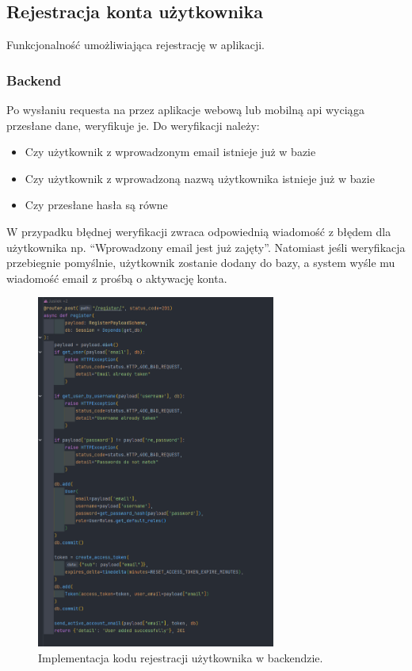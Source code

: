 
\subsection{Rejestracja konta użytkownika}
Funkcjonalność umożliwiająca rejestrację w aplikacji.

\subsubsection{Backend}
Po wysłaniu requesta na przez aplikacje webową lub mobilną api wyciąga przesłane dane, weryfikuje je. Do weryfikacji należy:

\begin{itemize}
    \item Czy użytkownik z wprowadzonym email istnieje już w bazie
    \item Czy użytkownik z wprowadzoną nazwą użytkownika istnieje już w bazie
    \item Czy przesłane hasła są równe
\end{itemize}

W przypadku błędnej weryfikacji zwraca odpowiednią wiadomość z błędem dla użytkownika np. “Wprowadzony email jest już zajęty”. Natomiast jeśli weryfikacja przebiegnie pomyślnie, użytkownik zostanie dodany do bazy, a system wyśle mu wiadomość email z prośbą o aktywację konta.

\begin{figure}[H]
    \centering
    \includegraphics[width=0.7\textwidth]{chapters/chapter_8/screens/rejestracja_backend}
    \caption{Implementacja kodu rejestracji użytkownika w backendzie.}
    \label{img:rejestracja_backend}
\end{figure}


